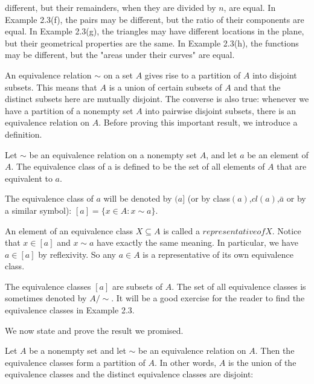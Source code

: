 \documentclass[11pt]{amsbook}
\begin{document}

\noindent different, but their remainders, when they are divided by $n$, are equal.
In Example 2.3(f), the pairs may be different, but the ratio of their
components are equal. In Example 2.3(g), the triangles may have
different locations in the plane, but their geometrical properties are the same. In Example 2.3(h), the functions may be different, but the "areas under their curves" are equal. \par
An equivalence relation $\sim$ on a set $A$ gives rise to a partition of $A$ into disjoint subsets. This means that $A$ is a union of certain subsets of $A$ and that the distinct subsets here are mutually disjoint. The converse is also true: whenever we have a partition of a nonempty set $A$ into pairwise disjoint subsets, there is an equivalence relation on $A$. Before proving this important result, we introduce a definition. \par
\begin{defn} Let $\sim$ be an equivalence relation on a nonempty set $A$,
and let $a$ be an element of $A$. The equivalence class of a is defined to be the set of all elements of $A$ that are equivalent to $a$.  \par
The equivalence class of $a$ will be denoted by $(a]$ (or by class$(a)$,$cl(a)$,$\bar{a}$ or by a similar symbol): $[a] = \{x \in A : x \sim a \}$.
\end{defn}
An element of an equivalence class $X \subseteq A$ is called a $representative of X$. Notice that $x \in [a]$ and $x \sim a$ have exactly the same meaning. In particular, we have $a \in [a]$ by reflexivity. So any $a \in A$ is a representative of its own equivalence class. \par
The equivalence classes $[a]$ are subsets of $A$. The set of all equivalence classes is sometimes denoted by $A/{\sim}$. It will be a good exercise for the reader to find the equivalence classes in Example 2.3. \par
We now state and prove the result we promised.\par
\begin{thm}
Let $A$ be a nonempty set and let $\sim$ be an equivalence 
relation on $A$. Then the equivalence classes form a partition of $A$. In
other words, $A$ is the union of the equivalence classes and the distinct equivalence classes are disjoint:
\end{thm} 
\end{document}
